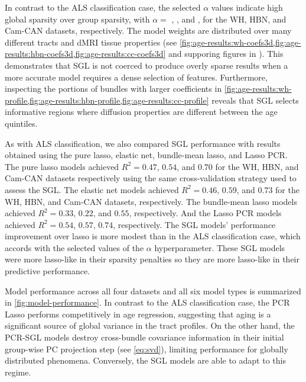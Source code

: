 \documentclass[10pt,letterpaper]{article}
\begin{document}
In contrast to the ALS classification case, the selected $\alpha$ values
indicate high global sparsity over group sparsity, with $\alpha = $
{\whLRatio}, {\hbnLRatio}, and {\ccLRatio}, for the WH, HBN, and Cam-CAN
datasets, respectively. The model weights are distributed over many different
tracts and dMRI tissue properties (see
\cref{fig:age-results:wh-coefs3d,fig:age-results:hbn-coefs3d,fig:age-results:cc-coefs3d}
and supporing figures in ).
This demonstrates that SGL is not coerced to produce overly sparse results
when a more accurate model requires a dense selection of features.
Furthermore, inspecting the portions of bundles with larger coefficients in
\cref{fig:age-results:wh-profile,fig:age-results:hbn-profile,fig:age-results:cc-profile}
reveals that SGL selects informative regions where diffusion properties are
different between the age quintiles.

As with ALS classification, we also compared SGL performance with results
obtained using
the pure lasso, elastic net, bundle-mean lasso, and Lasso PCR.
The pure lasso models achieved $R^2 = 0.47$, $0.54$, and $0.70$ for the WH, HBN, and Cam-CAN datasets respectively using the same cross-validation strategy used to assess the SGL.
The elastic net models achieved $R^2 = 0.46$, $0.59$, and $0.73$ for the WH, HBN, and Cam-CAN datasets, respectively. The bundle-mean lasso models achieved $R^2 = 0.33$, $0.22$, and $0.55$, respectively. And the Lasso PCR models achieved $R^2 = 0.54$, $0.57$, $0.74$, respectively.
The SGL models'
performance improvement over lasso is more modest than in the ALS
classification case, which accords with the selected values of the $\alpha$
hyperparameter. These SGL models were more lasso-like in their sparsity
penalties so they are more lasso-like in their predictive performance.

Model performance across all four datasets and all six model types is summarized
in \cref{fig:model-performance}. In contrast to the ALS classification case, the PCR Lasso performs
competitively in age regression, suggesting that aging is a significant source of global variance
in the tract profiles. On the other hand, the PCR-SGL models destroy cross-bundle covariance information
in their initial group-wise PC projection step (see \cref{eq:svd}), limiting performance
for globally distributed phenomena. Conversely, the SGL models are able to adapt to this regime.
\end{document}
